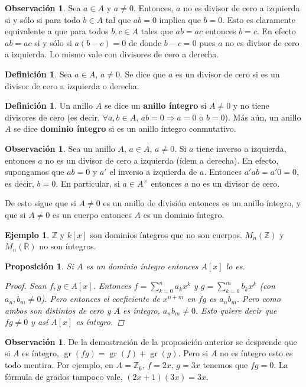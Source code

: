 \documentclass[12pt]{book}
\newtheorem{prop}[teo]{Proposición}
\theoremstyle{definition}
\newtheorem{obs}[teo]{Observación}
\newtheorem{defn}[teo]{Definición}
\newtheorem{ex}[teo]{Ejemplo}
\newcommand{\RR}{\mathbb{R}}      %
\newcommand{\ZZ}{\mathbb{Z}}      %
\DeclareMathOperator{\gr}{gr}
\begin{document}
\begin{obs}
Sea $a\in A$ y $a\neq 0$. Entonces, $a$ no es divisor de cero a izquierda si y sólo si para todo $b\in A$ tal que $ab=0$ implica que $b=0$. Esto es claramente equivalente a que para todos $b,c\in A$ tales que $ab=ac$ entonces $b=c$. En efecto $ab=ac$ si y sólo si $a(b-c)=0$ de donde $b-c=0$ pues $a$ no es divisor de cero a izquierda. Lo mismo vale con divisores de cero a derecha.
\end{obs}

\begin{defn}
Sea $a\in A$, $a\neq 0$. Se dice que $a$ es un divisor de cero si es un divisor de cero a izquierda o derecha.
\end{defn}

\begin{defn}
Un anillo $A$ se dice un \textbf{anillo íntegro} si $A\neq 0$ y no tiene divisores de cero (es decir, $\forall a,b\in A$, $ab=0\Longrightarrow a=0$ o $b=0$). Más aún, un anillo $A$ se dice \textbf{dominio íntegro} si es un anillo íntegro conmutativo.
\end{defn}

\begin{obs}
Sea un anillo $A$, $a\in A$, $a\neq 0$. Si $a$ tiene inverso a izquierda, entonces $a$ no es un divisor de cero a izquierda (ídem a derecha). En efecto, supongamos que $ab=0$ y $a'$ el inverso a izquierda de $a$. Entonces $a'ab = a'0 = 0$, es decir, $b=0$. En particular, si $a\in A^\times$ entonces $a$ no es un divisor de cero.

De esto sigue que si $A\neq 0$ es un anillo de división entonces es un anillo íntegro, y que si $A\neq 0$ es un cuerpo entonces $A$ es un dominio íntegro.
\end{obs}

\begin{ex}
$\ZZ$ y $k[x]$ son dominios íntegros que no son cuerpos. $M_n(\ZZ)$ y $M_n(\RR)$ no son íntegros.
\end{ex}

\begin{prop}
Si $A$ es un dominio íntegro entonces $A[x]$ lo es.
\begin{proof}
Sean $f,g\in A[x]$. Entonces $f=\displaystyle\sum_{k=0}^{n}a_k x^k$ y $g=\displaystyle\sum_{k=0}^{m}b_k x^k$ (con $a_n,b_m \neq 0$). Pero entonces el coeficiente de $x^{n+m}$ en $fg$ es $a_nb_m$. Pero como ambos son distintos de cero y $A$ es íntegro, $a_nb_m\neq 0$. Esto quiere decir que $fg\neq 0$ y así $A[x]$ es íntegro.
\end{proof}
\end{prop}
\begin{obs}
De la demostración de la proposición anterior se desprende que si $A$ es íntegro, $\gr (fg) = \gr (f) + \gr (g)$. Pero si $A$ no es íntegro esto es todo mentira. Por ejemplo, en $A= \ZZ_6$, $f=2x$, $g=3x$ tenemos que $fg = 0$. La fórmula de grados tampoco vale, $(2x+1)(3x)=3x$.
\end{obs}
\end{document}
